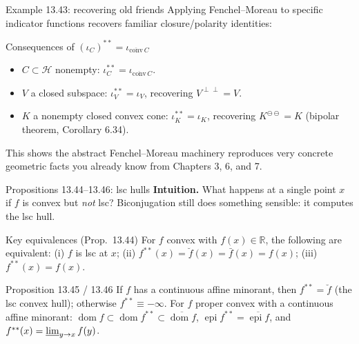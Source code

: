\documentclass[aspectratio=169,10pt]{beamer}
\newcommand{\R}{\mathbb{R}}
\newcommand{\Hil}{\mathcal{H}}
\newcommand{\dom}{\operatorname{dom}}
\newcommand{\epi}{\operatorname{epi}}
\newcommand{\iotaC}{\iota_C}
\newcommand{\biconj}[1]{#1^{**}}
\begin{document}
\begin{frame}{Example 13.43: recovering old friends}
  Applying Fenchel--Moreau to specific indicator functions recovers
  familiar closure/polarity identities:
  \begin{block}{Consequences of $\biconj{(\iotaC)}=\iota_{\overline{\mathrm{conv}}\,C}$}
    \begin{itemize}
      \item $C\subset\Hil$ nonempty: $\iota_C^{**} = \iota_{\overline{\mathrm{conv}}\,C}$.
      \item $V$ a closed subspace: $\iota_V^{**}=\iota_V$, recovering
        $V^{\perp\perp}=V$.
      \item $K$ a nonempty closed convex cone: $\iota_K^{**}=\iota_K$,
        recovering $K^{\ominus\ominus}=K$ (bipolar theorem, Corollary
        6.34).
    \end{itemize}
  \end{block}
  This shows the abstract Fenchel--Moreau machinery reproduces very
  concrete geometric facts you already know from Chapters 3, 6, and 7.
\end{frame}

\begin{frame}{Propositions 13.44--13.46: lsc hulls}
  \textbf{Intuition.} What happens at a single point $x$ if $f$ is convex
  but \emph{not} lsc? Biconjugation still does something sensible: it
  computes the lsc hull.
  \begin{block}{Key equivalences (Prop.\ 13.44)}
    For $f$ convex with $f(x)\in\R$, the following are equivalent:
    (i) $f$ is lsc at $x$; (ii) $\biconj f(x)=\breve f(x)=\bar f(x)=f(x)$;
    (iii) $\biconj f(x)=f(x)$.
  \end{block}
  \begin{block}{Proposition 13.45 / 13.46}
    If $f$ has a continuous affine minorant, then $\biconj f = \breve f$
    (the lsc convex hull); otherwise $\biconj f\equiv-\infty$. For $f$
    proper convex with a continuous affine minorant: $\dom f\subset
    \dom\biconj f\subset\overline{\dom f}$, $\epi\biconj f=\overline{\epi f}$,
    and $\biconj f(x) = \varliminf_{y\to x} f(y)$.
  \end{block}
\end{frame}
\end{document}
